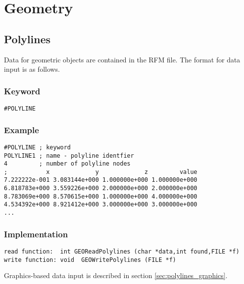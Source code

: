 \section{Geometry}

\subsection{Polylines}

Data for geometric objects are contained in the RFM file. The
format for data input is as follows.

\subsubsection{Keyword}

\small
\begin{verbatim}
#POLYLINE
\end{verbatim}
\normalsize

\subsubsection{Example}

\small
\begin{verbatim}
#POLYLINE ; keyword
POLYLINE1 ; name - polyline identfier
4         ; number of polyline nodes
;           x             y             z         value
7.222222e-001 3.083144e+000 1.000000e+000 1.000000e+000
6.818783e+000 3.559226e+000 2.000000e+000 2.000000e+000
8.783069e+000 8.570615e+000 1.000000e+000 4.000000e+000
4.534392e+000 8.921412e+000 3.000000e+000 3.000000e+000
...
\end{verbatim}
\normalsize


\subsubsection{Implementation}

\small
\begin{verbatim}
read function:  int GEOReadPolylines (char *data,int found,FILE *f)
write function: void  GEOWritePolylines (FILE *f)
\end{verbatim}
\normalsize


Graphics-based data input is described in section
\ref{sec:polylines_graphics}.
